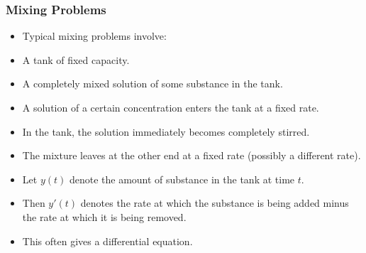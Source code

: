 \begin{frame}
\frametitle{Mixing Problems}
\begin{itemize}
\item  Typical mixing problems involve:
\item  A tank of fixed capacity.
\item  A completely mixed solution of some substance in the tank.
\item  A solution of a certain concentration enters the tank at a fixed rate.
\item  In the tank, the solution immediately becomes completely stirred.
\item  The mixture leaves at the other end at a fixed rate (possibly a different rate).
\item<2->  Let $y(t)$ denote the amount of substance in the tank at time $t$.
\item<2->  Then $y'(t)$ denotes the rate at which the substance is being added minus the rate at which it is being removed.
\item<2->  This often gives a differential equation.
\end{itemize}
\end{frame}
